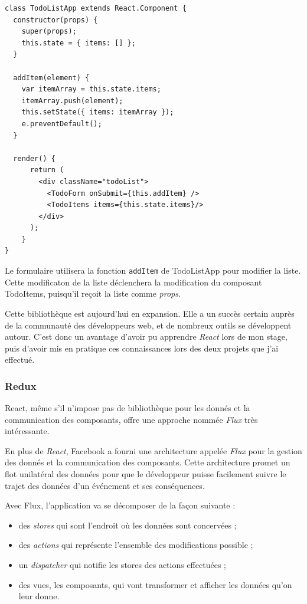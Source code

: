 \begin{verbatim}
class TodoListApp extends React.Component {
  constructor(props) {
    super(props);
    this.state = { items: [] };
  }

  addItem(element) {
    var itemArray = this.state.items;
    itemArray.push(element);
    this.setState({ items: itemArray });
    e.preventDefault();
  }

  render() {
      return (
        <div className="todoList">
          <TodoForm onSubmit={this.addItem} />
          <TodoItems items={this.state.items}/>
        </div>
      );
    }
}
\end{verbatim}

Le formulaire utilisera la fonction \texttt{addItem} de TodoListApp pour
modifier la liste. Cette modificaton de la liste déclenchera la
modification du composant TodoItems, puisqu'il reçoit la liste comme
\emph{props}.

\bigskip

Cette bibliothèque est aujourd'hui en expansion. Elle a un succès
certain auprès de la communauté des développeurs web, et de nombreux
outils se développent autour. C'est donc un avantage d'avoir pu
apprendre \emph{React} lors de mon stage, puis d'avoir mis en pratique
ces connaissances lors des deux projets que j'ai effectué.

\bigskip

\subsubsection{Redux}\label{redux}

\bigskip

React, même s'il n'impose pas de bibliothèque pour les donnés et la
communication des composants, offre une approche nommée \emph{Flux} très
intéressante.

\bigskip

En plus de \emph{React}, Facebook a fourni une architecture appelée
\emph{Flux} pour la gestion des donnés et la communication des
composants. Cette architecture promet un flot unilatéral des données
pour que le développeur puisse facilement suivre le trajet des données
d'un événement et ses conséquences.

\bigskip

Avec Flux, l'application va se décomposer de la façon suivante :

\begin{itemize}
\tightlist
\item
  des \emph{stores} qui sont l'endroit où les données sont concervées ;
\item
  des \emph{actions} qui représente l'ensemble des modifications
  possible ;
\item
  un \emph{dispatcher} qui notifie les stores des actions effectuées ;
\item
  des vues, les composants, qui vont transformer et afficher les données
  qu'on leur donne.
\end{itemize}

